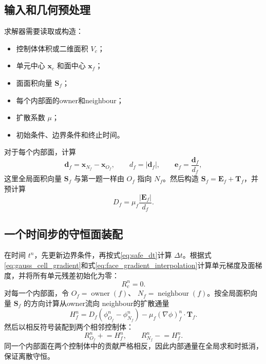 \documentclass[UTF8,12pt,a4paper]{ctexart}
\numberwithin{equation}{section}
\newcommand{\Sf}{\bm S}
\newcommand{\xf}{\bm x}
\newcommand{\ef}{\bm e}
\newcommand{\Ef}{\bm E}
\newcommand{\Tf}{\bm T}
\begin{document}
\subsection{输入和几何预处理}

求解器需要读取或构造：
\begin{itemize}
  \item 控制体体积或二维面积 $V_c$；
  \item 单元中心 $\xf_c$ 和面中心 $\xf_f$；
  \item 面面积向量 $\Sf_f$；
  \item 每个内部面的owner和neighbour；
  \item 扩散系数 $\mu$；
  \item 初始条件、边界条件和终止时间。
\end{itemize}
对于每个内部面，计算
\begin{equation}
  \bm d_f=\xf_{N_f}-\xf_{O_f},
  \qquad
  d_f=|\bm d_f|,
  \qquad
  \ef_f=\frac{\bm d_f}{d_f},
  \label{eq:algorithm_geometry}
\end{equation}
这里全局面积向量 $\Sf_f$ 与第一题一样由 $O_f$ 指向 $N_f$。然后构造
$\Sf_f=\Ef_f+\Tf_f$，并预计算
\begin{equation}
  D_f=\mu_f\frac{|\Ef_f|}{d_f}.
  \label{eq:precompute_D}
\end{equation}

\subsection{一个时间步的守恒面装配}

在时间 $t^n$，先更新边界条件，再按式\eqref{eq:safe_dt}计算 $\Delta t$。根据式\eqref{eq:gauss_cell_gradient}和式\eqref{eq:face_gradient_interpolation}计算单元梯度及面梯度，并将所有单元残差初始化为零：
\begin{equation}
  R_c^n=0.
  \label{eq:residual_zero}
\end{equation}
对每一个内部面，令 $O_f=\operatorname{owner}(f)$、
$N_f=\operatorname{neighbour}(f)$。按全局面积向量 $\Sf_f$ 的方向计算从owner流向
neighbour的扩散通量
\begin{equation}
  H_f^n
  =D_f(\phi_{O_f}^n-\phi_{N_f}^n)
  -\mu_f(\nabla\phi)_f^n\cdot\Tf_f.
  \label{eq:algorithm_face_flux}
\end{equation}
然后以相反符号装配到两个相邻控制体：
\begin{equation}
  R_{O_f}^n\mathrel{+}=H_f^n,
  \qquad
  R_{N_f}^n\mathrel{-}=H_f^n.
  \label{eq:owner_neighbour_assembly}
\end{equation}
同一个内部面在两个控制体中的贡献严格相反，因此内部通量在全局求和时抵消，保证离散守恒。
\end{document}
